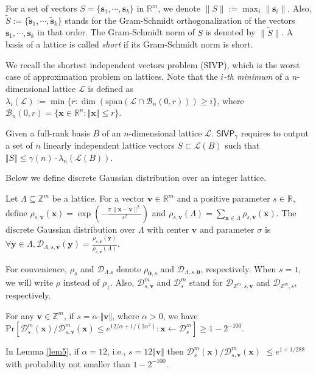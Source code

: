 \documentclass[runningheads]{llncs}
\def\ZZ{\mathbb{Z}}
\def\RR{\mathbb{R}}
\def\cal{\mathcal}
\def\bf{\mathbf}
\def\calL{\mathcal{L}}
\def\Pr{\mathrm{Pr}}
\def\x{\bf{x}}
\def\L{\Lambda}
\def\s{\bf{s}}
\begin{document}
For a set of vectors $S=\{\s_1,\cdots,\s_k\}$ in $\mathbb{R}^m$,  
we denote $\|S\|:=\max_i\|\s_i\|$. 
Also,  $\widetilde{S}:=\{\widetilde{\s}_1,\cdots,\widetilde{\s}_k \}$ stands for the 
Gram-Schmidt orthogonalization of the vectors $\s_1,\cdots,\s_k$ in that order. 
The Gram-Schmidt norm of $S$ is denoted by $\|\widetilde{S}\|$. 
A basis of a lattice is called \textit{short} if its Gram-Schmidt norm is short.

We recall the shortest independent vectors problem (SIVP), 
which is the worst case of approximation problem on lattices. 
Note that the \textit{$i$-th minimum} of a $n$-dimensional lattice $\mathcal{L}$ is defined as      
$\lambda_i(\mathcal{L}):=\min\{r: \dim(\text{span}(\mathcal{L} \cap \mathcal{B}_n(0,r))) \geq i\}$, 
where $\mathcal{B}_n(0,r)=\{\mathbf{x} \in \mathbb{R}^n: \Vert \mathbf{x}\Vert \leq r \}$.   

\begin{definition}[SIVP] \label{sivp}
Given a full-rank basis $B$ of an $n$-dimensional lattice $\calL$.
$\textsf{SIVP}_{\gamma}$ requires to output a set of $n$ linearly independent lattice 
vectors $S \subset \calL(B)$ such that $\Vert S\Vert \leq \gamma(n)\cdot \lambda_n(\calL(B))$.
\end{definition}


\noindent 
Below we define 
discrete Gaussian distribution over an integer lattice.
\begin{definition}
	Let $\L\subseteq\ZZ^m$ be a lattice. For a vector $\mathbf{v}\in\RR^m$ and a positive parameter $s\in\RR$, define
	$\rho_{s,\mathbf{v}}(\x)=\exp\left(-\frac{\pi\|\x-\mathbf{v}\|^2}{s^2}\right)$ and $ 	\rho_{s,\bf{v}}(\L)=\sum_{\x\in\L}\rho_{s,\mathbf{v}}(\x).    $
	The discrete Gaussian distribution over $\L$ with center $\mathbf{v}$ and parameter $\sigma$ is
	$\forall \bf{y}\in\L,\cal{D}_{\L,s,\mathbf{v}}(\bf{y})=\frac{\rho_{s,\mathbf{v}}(\bf{y})}{\rho_{s,\mathbf{v}}(\L)}.$
\end{definition}
For convenience,  $\rho_s$ and $\cal{D}_{\L.s}$ denote $\rho_{\bf{0},s}$ and $\cal{D}_{\L,s,\bf{0}}$, respectively. 
When $s=1$, we will write $\rho$ instead of $\rho_1$. 
Also, $\cal{D}^m_{s,\mathbf{v}}$ and $\cal{D}^m_{s}$ stand for  
$\mathcal{D}_{\mathbb{Z}^m,s,\mathbf{v}}$ and $\mathcal{D}_{\mathbb{Z}^m,s}$, respectively.
\begin{lemma} \label{lem5} 
	For any $\mathbf{v} \in \mathbb{Z}^m$, if $s=\alpha \cdot \Vert \mathbf{v}\Vert$, where $\alpha>0$, we have
	$\Pr\left[ {\mathcal{D}_{s}^m(\mathbf{x})}/{\cal{D}^m_{s,\mathbf{v}}(\mathbf{x})}\leq e^{12/\alpha+1/(2\alpha^2)}: \mathbf{x}\leftarrow \mathcal{D}_s^m\right] \geq 1-2^{-100}.$
\end{lemma}
\begin{remark}\label{rem2}
	In Lemma \ref{lem5}, if $\alpha=12$, i.e., $s=12\Vert \mathbf{v} \Vert $ then  ${\mathcal{D}_{s}^m(\mathbf{x})}/{\mathcal{D}_{s,\mathbf{v}}^m(\mathbf{x})}$ $\leq e^{1+1/288}$ with probability not smaller than $1-2^{-100}$. 
\end{remark}       
	
\end{document}
